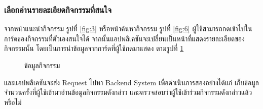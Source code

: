 \documentclass[14pt,oneside,openright,a4paper]{cpe-thai-project}
\begin{document}
\subsubsection{เลือกอ่านรายละเอียดกิจกรรมที่สนใจ}
จากหน้าแนะนำกิจกรรม รูปที่ \ref{fig:3}   หรือหน้าค้นหากิจกรรม รูปที่ \ref{fig:6}  ผู้ใช้สามารถกดเข้าไปในการ์ดของกิจกรรมที่ตัวเองสนใจได้ จากนั้นแอปพลิเคชันจะเปลี่ยนเป็นหน้าที่แสดงรายละเอียดของกิจกรรมนั้น โดยเป็นการนำข้อมูลจากการ์ดที่ผู้ใช้กดมาแสดง ตามรูปที่  \ref{fig:13}
\begin{figure}[H]\centering
  \setlength{\fboxrule}{0.5mm}
  \setlength{\fboxsep}{0.5cm}
  \caption{ข้อมูลกิจกรรม}\label{fig:13}
\end{figure}
และแอปพลิเคชันจะส่ง Request ไปหา Backend System เพื่อดำเนินการสองอย่างได้แก่ เก็บข้อมูลจำนวนครั้งที่ผู้ใช้เข้ามาอ่านข้อมูลกิจกรรมดังกล่าว และตรวจสอบว่าผู้ใช้เข้าร่วมกิจกรรมดังกล่าวแล้วหรือไม่
\end{document}
